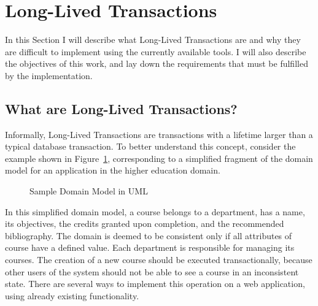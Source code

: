 \documentclass{llncs}
\begin{document}
\section{Long-Lived Transactions}

In this Section I will describe what Long-Lived Transactions are and
why they are difficult to implement using the currently available
tools. I will also describe the objectives of this work, and lay down
the requirements that must be fulfilled by the implementation.

\subsection{What are Long-Lived Transactions?}
\label{sec:what}

Informally, Long-Lived Transactions are transactions with a lifetime
larger than a typical database transaction. To better understand this
concept, consider the example shown in Figure~\ref{fig:courseDomain},
corresponding to a simplified fragment of the domain model for an
application in the higher education domain.

\begin{figure}
  \centering

\caption{Sample Domain Model in UML}
\label{fig:courseDomain}

\end{figure}

In this simplified domain model, a course belongs to a department, has
a name, its objectives, the credits granted upon completion, and the
recommended bibliography. The domain is deemed to be consistent only
if all attributes of course have a defined value. Each department is
responsible for managing its courses. The creation of a new course
should be executed transactionally, because other users of the system
should not be able to see a course in an inconsistent state. There are
several ways to implement this operation on a web application, using already existing
functionality.
\end{document}
